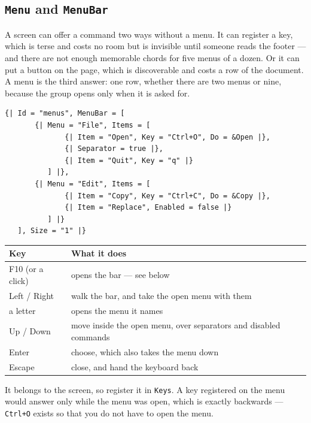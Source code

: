 \documentclass[11pt,a4paper,twoside,openany]{book}
\newcommand{\code}[1]{\texttt{\small #1}}
\begin{document}
\subsection{\texttt{Menu} and \texttt{MenuBar}}

A screen can offer a command two ways without a menu. It can register a key, which
is terse and costs no room but is invisible until someone reads the footer --- and
there are not enough memorable chords for five menus of a dozen. Or it can put a
button on the page, which is discoverable and costs a row of the document. A menu
is the third answer: one row, whether there are two menus or nine, because the
group opens only when it is asked for.

\begin{lstlisting}
{| Id = "menus", MenuBar = [
       {| Menu = "File", Items = [
              {| Item = "Open", Key = "Ctrl+O", Do = &Open |},
              {| Separator = true |},
              {| Item = "Quit", Key = "q" |}
          ] |},
       {| Menu = "Edit", Items = [
              {| Item = "Copy", Key = "Ctrl+C", Do = &Copy |},
              {| Item = "Replace", Enabled = false |}
          ] |}
   ], Size = "1" |}
\end{lstlisting}

\begin{center}
\begin{tabular}{@{}ll@{}}
\toprule
\textbf{\normalfont\sffamily Key} & \textbf{\normalfont\sffamily What it does} \\
\midrule
F10 (or a click)   & opens the bar --- see below \\
Left / Right       & walk the bar, and take the open menu with them \\
a letter           & opens the menu it names \\
Up / Down          & move inside the open menu, over separators and disabled commands \\
Enter              & choose, which also takes the menu down \\
Escape             & close, and hand the keyboard back \\
\bottomrule
\end{tabular}
\end{center}

\begin{warnbox}
It belongs to the screen, so register it in \code{Keys}. A key registered on the
menu would answer only while the menu was open, which is exactly backwards ---
\code{Ctrl+O} exists so that you do not have to open the menu.
\end{warnbox}
\end{document}
